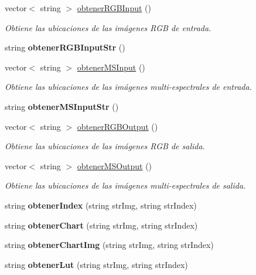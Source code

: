 \begin{DoxyCompactItemize}
vector$<$ string $>$ \mbox{\hyperlink{classIndexCalculation_aacf5294ab87007a511f9f9e9772855af}{obtener\+R\+G\+B\+Input}} ()
\begin{DoxyCompactList}\small\item\em Obtiene las ubicaciones de las imágenes R\+GB de entrada. \end{DoxyCompactList}\item 
\mbox{\label{classIndexCalculation_a4f6d8515c187dde8c9edd962ceee6271}} 
string {\bfseries obtener\+R\+G\+B\+Input\+Str} ()
\item 
vector$<$ string $>$ \mbox{\hyperlink{classIndexCalculation_a889a95c13bc480c1194016ca0e1e9559}{obtener\+M\+S\+Input}} ()
\begin{DoxyCompactList}\small\item\em Obtiene las ubicaciones de las imágenes multi-\/espectrales de entrada. \end{DoxyCompactList}\item 
\mbox{\label{classIndexCalculation_a1acdd629f4edc2c3cb74746832783203}} 
string {\bfseries obtener\+M\+S\+Input\+Str} ()
\item 
vector$<$ string $>$ \mbox{\hyperlink{classIndexCalculation_a23a9f9a23db086109989fb93450a70d7}{obtener\+R\+G\+B\+Output}} ()
\begin{DoxyCompactList}\small\item\em Obtiene las ubicaciones de las imágenes R\+GB de salida. \end{DoxyCompactList}\item 
vector$<$ string $>$ \mbox{\hyperlink{classIndexCalculation_a43b986cd58175d47714a399e7fdfd7e3}{obtener\+M\+S\+Output}} ()
\begin{DoxyCompactList}\small\item\em Obtiene las ubicaciones de las imágenes multi-\/espectrales de salida. \end{DoxyCompactList}\item 
\mbox{\label{classIndexCalculation_ae317d7859059ba6ad24fc54dadd8b2b7}} 
string {\bfseries obtener\+Index} (string str\+Img, string str\+Index)
\item 
\mbox{\label{classIndexCalculation_a41d32a9c7c279ae5192d38f4863fe0e4}} 
string {\bfseries obtener\+Chart} (string str\+Img, string str\+Index)
\item 
\mbox{\label{classIndexCalculation_a52874b7110859a2ce475ea058ac68bfd}} 
string {\bfseries obtener\+Chart\+Img} (string str\+Img, string str\+Index)
\item 
\mbox{\label{classIndexCalculation_a33f09c3755a9e6a83261c1fd71a9e20d}} 
string {\bfseries obtener\+Lut} (string str\+Img, string str\+Index)
\end{DoxyCompactItemize}
